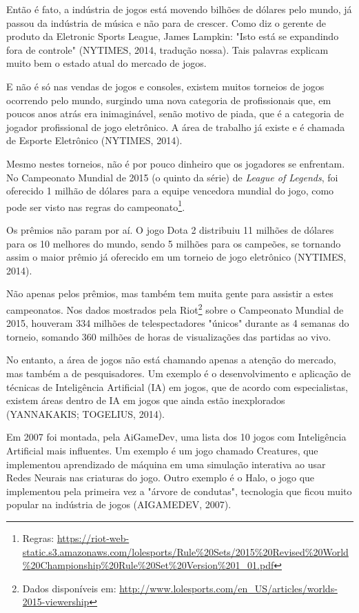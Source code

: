 \documentclass[12pt,a4paper]{article}
\begin{document}
	Então é fato, a indústria de jogos está movendo bilhões de dólares pelo mundo,
	já passou da indústria de música e não para de crescer.
	Como diz o gerente de produto da Eletronic Sports League, James Lampkin:
	"Isto está se expandindo fora de controle"{}
	(NYTIMES, 2014, tradução nossa).
	Tais palavras explicam muito bem o estado atual do mercado de jogos.
	
	E não é só nas vendas de jogos e consoles,
	existem muitos torneios de jogos ocorrendo pelo mundo,
	surgindo uma nova categoria de profissionais que,
	em poucos anos atrás era inimaginável, senão motivo de piada,
	que é a categoria de jogador profissional de jogo eletrônico.
	A área de trabalho já existe e é chamada de Esporte Eletrônico (NYTIMES, 2014).
	
	Mesmo nestes torneios, não é por pouco dinheiro que os jogadores se enfrentam.
	No Campeonato Mundial de 2015 (o quinto da série) de \textit{League of Legends},
	foi oferecido 1 milhão de dólares para a equipe vencedora mundial do jogo,
	como pode ser visto nas regras do campeonato\footnote{Regras: \url{https://riot-web-static.s3.amazonaws.com/lolesports/Rule\%20Sets/2015\%20Revised\%20World\%20Championship\%20Rule\%20Set\%20Version\%201\_01.pdf}}.
	
	Os prêmios não param por aí.
	O jogo Dota 2 distribuiu 11 milhões de dólares para os 10 melhores do mundo,
	sendo 5 milhões para os campeões,
	se tornando assim o maior prêmio já oferecido em um torneio de jogo eletrônico (NYTIMES, 2014).
	
	Não apenas pelos prêmios, mas também tem muita gente para assistir a estes campeonatos.
	Nos dados mostrados pela Riot\footnote{Dados disponíveis em: \url{http://www.lolesports.com/en_US/articles/worlds-2015-viewership}}
	sobre o Campeonato Mundial de 2015,
	houveram 334 milhões de telespectadores "únicos"{} durante as 4 semanas do torneio,
	somando 360 milhões de horas de visualizações das partidas ao vivo.
	
	No entanto, a área de jogos não está chamando apenas a atenção do mercado,
	mas também a de pesquisadores.
	Um exemplo é o desenvolvimento e aplicação de técnicas de Inteligência Artificial (IA) em jogos,
	que de acordo com especialistas,
	existem áreas dentro de IA em jogos que ainda estão inexplorados (YANNAKAKIS; TOGELIUS, 2014).
	
	Em 2007 foi montada, pela AiGameDev, uma lista dos 10 jogos com Inteligência Artificial mais influentes.
	Um exemplo é um jogo chamado Creatures,
	que implementou aprendizado de máquina em uma simulação interativa
	ao usar Redes Neurais nas criaturas do jogo.
	Outro exemplo é o Halo,
	o jogo que implementou pela primeira vez a "árvore de condutas"{},
	tecnologia que ficou muito popular na indústria de jogos (AIGAMEDEV, 2007).
	
\end{document}
